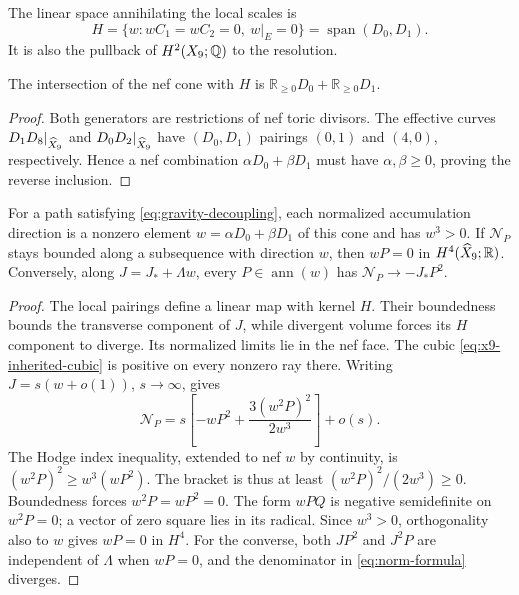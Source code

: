 The linear space annihilating the local scales is
\begin{equation}
 H=\{w:wC_1=wC_2=0,\ w|_E=0\}
   =\operatorname{span}(D_0,D_1).
 \label{eq:local-scale-plane}
\end{equation}
It is also the pullback of $H^2(X_9;\mathbb Q)$ to the resolution.

\begin{proposition}\label{prop:local-scale-face}
The intersection of the nef cone with $H$ is
$\mathbb R_{\geq0}D_0+\mathbb R_{\geq0}D_1$.
\end{proposition}
\begin{proof}
Both generators are restrictions of nef toric divisors. The effective
curves $D_1D_8|_{\widehat X_9}$ and $D_0D_2|_{\widehat X_9}$ have
$(D_0,D_1)$ pairings $(0,1)$ and $(4,0)$, respectively. Hence a
nef combination $\alpha D_0+\beta D_1$ must have
$\alpha,\beta\geq0$, proving the reverse inclusion.
\end{proof}

\begin{lemma}\label{lem:dynamical-subspace}
For a path satisfying \eqref{eq:gravity-decoupling}, each normalized
accumulation direction is a nonzero element
$w=\alpha D_0+\beta D_1$ of this cone and has $w^3>0$.
If $\mathcal N_P$ stays bounded along a subsequence with direction
$w$, then $wP=0$ in $H^4(\widehat X_9;\mathbb R)$. Conversely, along
$J=J_*+\Lambda w$, every $P\in\operatorname{ann}(w)$ has
$\mathcal N_P\to-J_*P^2$.
\end{lemma}
\begin{proof}
The local pairings define a linear map with kernel $H$.
Their boundedness bounds the transverse component of $J$, while
divergent volume forces its $H$ component to diverge. Its normalized
limits lie in the nef face. The cubic
\eqref{eq:x9-inherited-cubic} is positive on every nonzero ray there.
Writing $J=s(w+o(1))$, $s\to\infty$, gives
\begin{equation}
 \mathcal N_P=s\left[-wP^2+\frac{3(w^2P)^2}{2w^3}\right]+o(s).
\end{equation}
The Hodge index inequality, extended to nef $w$ by continuity,
is $(w^2P)^2\geq w^3(wP^2)$. The bracket is thus at least
$(w^2P)^2/(2w^3)\geq0$. Boundedness forces $w^2P=wP^2=0$.
The form $wPQ$ is negative semidefinite on $w^2P=0$;
a vector of zero square lies in its radical. Since $w^3>0$,
orthogonality also to $w$ gives $wP=0$ in $H^4$.
For the converse, both $JP^2$ and $J^2P$ are independent of
$\Lambda$ when $wP=0$, and the denominator in
\eqref{eq:norm-formula} diverges.
\end{proof}

